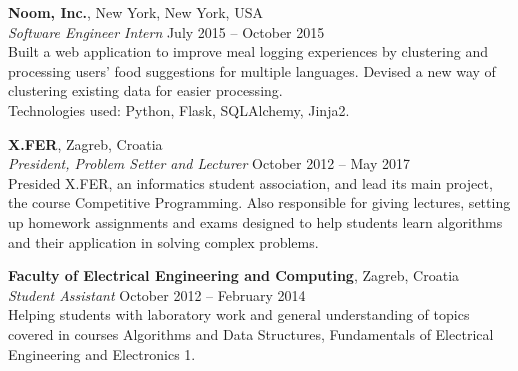 \documentclass[margin,line]{resume}
\begin{document}
\begin{resume}
\textbf{Noom, Inc.}, New York, New York, USA \vspace{1mm}\\\vspace{1mm}%
\textsl{Software Engineer Intern} \hfill July 2015 -- October 2015\\%
Built a web application to improve meal logging experiences by clustering and processing users' food suggestions for multiple languages. Devised a new way of clustering existing data for easier processing. \\
Technologies used: Python, Flask, SQLAlchemy, Jinja2.

\textbf{X.FER}, Zagreb, Croatia \vspace{1mm}\\\vspace{1mm}%
\textsl{President, Problem Setter and Lecturer} \hfill October 2012 -- May 2017\\%
Presided X.FER, an informatics student association, and lead its main project, the course Competitive Programming. Also responsible for giving lectures, setting up homework assignments and exams designed to help students learn algorithms and their application in solving complex problems.


\textbf{Faculty of Electrical Engineering and Computing}, Zagreb, Croatia \vspace{1mm}\\\vspace{1mm}%
\textsl{Student Assistant} \hfill October 2012 -- February 2014\\%
Helping students with laboratory work and general understanding of topics covered in courses Algorithms  and  Data  Structures, Fundamentals  of  Electrical  Engineering and  Electronics 1.




\end{resume}
\end{document}
